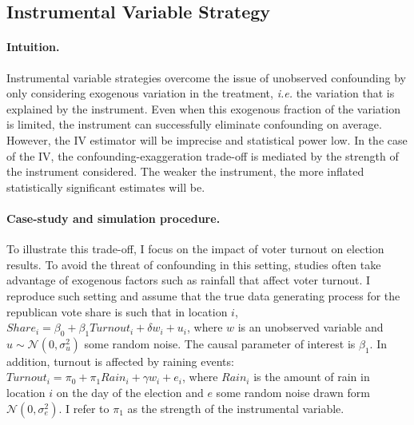 \documentclass[usletter, 12pt]{article}
\begin{document}
        
		
        		\subsection{Instrumental Variable Strategy}\label{sim_IV}
            
                		\paragraph{Intuition.} 
        			Instrumental variable strategies overcome the issue of unobserved confounding by only considering exogenous variation in the treatment, \textit{i.e.} the variation that is explained by the instrument. Even when this exogenous fraction of the variation is limited, the instrument can successfully eliminate confounding on average. However, the IV estimator will be imprecise and statistical power low. In the case of the IV, the confounding-exaggeration trade-off is mediated by the strength of the instrument considered. The weaker the instrument, the more inflated statistically significant estimates will be.
        		
        			\paragraph{Case-study and simulation procedure.} 
        			To illustrate this trade-off, I focus on the impact of voter turnout on election results. To avoid the threat of confounding in this setting, studies often take advantage of exogenous factors such as rainfall that affect voter turnout. I reproduce such setting and assume that the true data generating process for the republican vote share is such that  in location $i$, $Share_{i} = \beta_{0} + \beta_{1} Turnout_{i} + \delta w_{i} + u_{i}$, where $w$ is an unobserved variable and $u \sim \mathcal{N}(0, \sigma_{u}^{2})$ some random noise. The causal parameter of interest is $\beta_{1}$. In addition, turnout is affected by raining events: $Turnout_{i} = \pi_{0} + \pi_{1} Rain_{i} + \gamma w_{i} + e_{i}$, where $Rain_{i}$ is the amount of rain in location $i$ on the day of the election 
			and $e$ some random noise drawn form $\mathcal{N}(0, \sigma_{e}^{2})$. I refer to $\pi_{1}$ as the strength of the instrumental variable. 
        			
\end{document}
